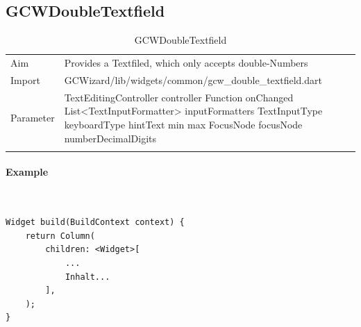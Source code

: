 \newpage
\subsection{GCWDoubleTextfield}
\label{fig: GCWDoubleTextfield}
\begin{table}[H]
\begin{tabular}[h]{p{2cm}p{9cm}}
    \caption{GCWDoubleTextfield}
    Aim       & Provides a Textfiled, which only accepts double-Numbers\\
    Import    & GCWizard/lib/widgets/common/gcw\_double\_textfield.dart\\
    Parameter & TextEditingController controller\newline
                Function onChanged\newline
                List<TextInputFormatter> inputFormatters\newline
                TextInputType keyboardType\newline
                hintText\newline
                min\newline
                max\newline
                FocusNode focusNode\newline
                numberDecimalDigits\newline\\
    \label{tab:GCWDoubleTextfield}
\end{tabular}
\end{table}
\paragraph*{Example} \,
\begin{lstlisting}
Widget build(BuildContext context) {
    return Column(
        children: <Widget>[
            ...
            Inhalt...
        ],
    );
}
\end{lstlisting}
\label{fig: ExampleGCWDoubleTextfield}

\newpage
